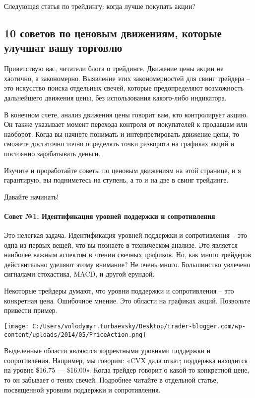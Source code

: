\documentclass[a5paper]{article}
\begin{document}
Следующая статья по трейдингу: когда лучше покупать акции?

\subsection{10 советов по ценовым движениям, которые улучшат вашу
  торговлю}

Приветствую вас, читатели блога о трейдинге. Движение цены акции не хаотично, а закономерно. Выявление этих закономерностей для свинг трейдера – это искусство поиска отдельных свечей, которые предопределяют возможность дальнейшего движения цены, без использования какого-либо индикатора.

В конечном счете, анализ движения цены говорит вам, кто контролирует акцию. Он также указывает момент перехода контроля от покупателей к продавцам или наоборот. Когда вы начнете понимать и интерпретировать движение цены, то сможете достаточно точно определять точки разворота на графиках акций и постоянно зарабатывать деньги.

Изучите и проработайте советы по ценовым движениям на этой странице, и я гарантирую, вы подниметесь на ступень, а то и на две в свинг трейдинге.

Давайте начинать!

\paragraph{Совет №1. Идентификация уровней поддержки и
  сопротивления}

Это нелегкая задача. Идентификация уровней поддержки и сопротивления – это одна из первых вещей, что вы познаете в техническом анализе. Это является наиболее важным аспектом в чтении свечных графиков. Но, как много трейдеров действительно уделяют этому внимание? Не очень много. Большинство увлечено сигналами стохастика, MACD, и другой ерундой.

Некоторые трейдеры думают, что уровни поддержки и сопротивления – это
конкретная цена. Ошибочное мнение. Это области на графиках
акций. Позвольте привести пример.

\texttt{[image: C:/Users/volodymyr.turbaevsky/Desktop/trader-blogger.com/wp-content/uploads/2014/05/PriceAction.png]}

Выделенные области являются корректными уровнями поддержки и
сопротивления. Например, мы говорим: «CVX дала откат; поддержка
находится на уровне \$16.75 — \$16.00». Когда трейдер говорит о
какой-то конкретной цене, то он забывает о тенях свечей. Подробнее
читайте в отдельной статье, посвященной уровням поддержки и
сопротивления.
\end{document}
